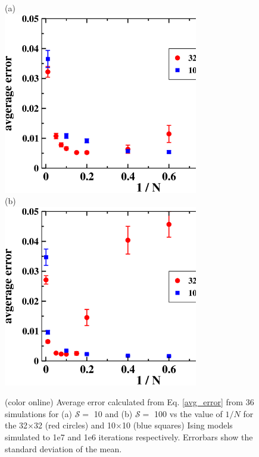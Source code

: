\documentclass[aps,pre,reprint,superscriptaddress,showkeys]{revtex4-2}
\begin{document}
\begin{figure}[h!]
(a)\\
\includegraphics[width=8.5cm]{fig2a.eps}\\
(b)\\
\includegraphics[width=8.5cm]{fig2b.eps}\\

\caption{(color online) Average error calculated from Eq. \ref{avg_error} from 36 simulations for (a) $\mathcal{S}=$ 10 and (b) $\mathcal{S}=$ 100   vs the value of $1/N$ for the 32$\times$32 (red circles) and 10$\times$10 (blue squares) Ising models simulated to 1e7 and 1e6 iterations respectively.  Errorbars show the standard deviation of the mean. \label{N_dependence}}
\end{figure}
\end{document}
